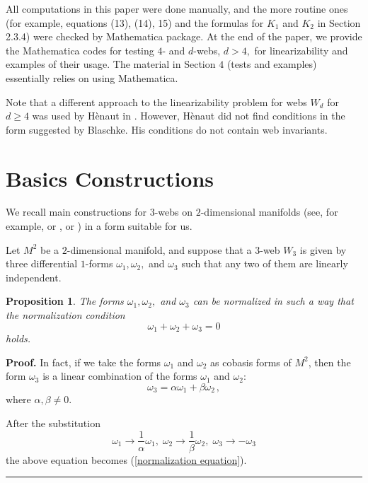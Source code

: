 \documentclass{article}
\newtheorem{proposition}[theorem]{Proposition}
\newenvironment{proof}[1][Proof]{\noindent\textbf{#1.} }{\ \rule{0.5em}{0.5em}}
\begin{document}
All computations in this paper were done manually, and the more routine ones
(for example, equations (13), (14), 15) and the formulas for $K_{1}$ and $%
K_{2}$ in Section 2.3.4) were checked by Mathematica package. At the end of
the paper, we provide the Mathematica codes for testing $4$- and $d$-webs, $%
d>4,$ for linearizability and examples of their usage. The material in
Section $4$ (tests and examples) essentially relies on using Mathematica.

Note that a different approach to the linearizability problem for webs $W_{d}
$ for $d\geq 4$ was used by H\`{e}naut in \cite{H 93}. However, H\`{e}naut
did not find conditions in the form suggested by Blaschke. His conditions do
not contain web invariants.

\section{Basics Constructions}

We recall main constructions for $3$-webs on $2$-dimensional manifolds (see,
for example, \cite{BB 38} or \cite{B 55} , or \cite{G 89}) in a form
suitable for us.

Let $M^{2}$ be a $2$-dimensional manifold, and suppose that a $3$-web $W_{3}$
is given by three differential $1$-forms $\omega _{1},\omega _{2},$ and $%
\omega _{3}$ such that any two of them are linearly independent.

\begin{proposition}
The forms $\omega _{1},\omega _{2},$ and $\omega _{3}$ can be normalized in
such a way that the normalization condition
\begin{equation}
\omega _{1}+\omega _{2}+\omega _{3}=0  \label{normalization equation}
\end{equation}%
holds.
\end{proposition}

\begin{proof}
In fact, if we take the forms $\omega _{1}$ and $\omega _{2}$ as cobasis
forms of $M^{2}$, then the form $\omega _{3}$ is a linear combination of the
forms $\omega _{1}$ and $\omega _{2}:$
\begin{equation*}
\omega _{3}=\alpha \omega _{1}+\beta \omega _{2\,},
\end{equation*}
where $\alpha ,\beta \neq 0.$

After the substitution
\begin{equation*}
\omega _{1}\rightarrow \frac{1}{\alpha }\omega _{1},\;\omega _{2}\rightarrow
\frac{1}{\beta }\omega _{2},\;\omega _{3}\rightarrow -\omega _{3}
\end{equation*}
the above equation becomes (\ref{normalization equation}).
\end{proof}
\end{document}
